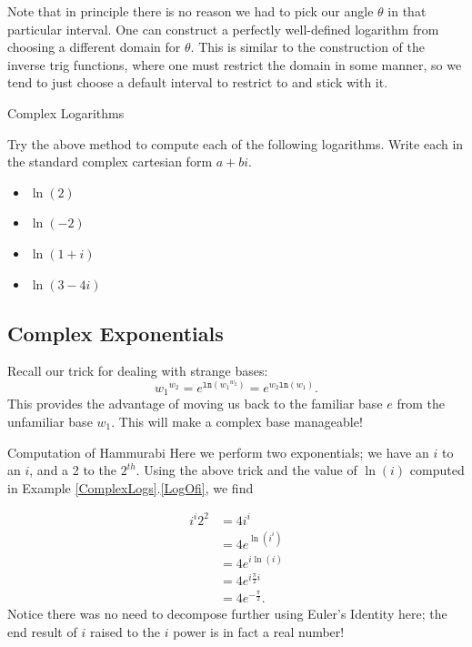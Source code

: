 Note that in principle there is no reason we had to pick our angle $\theta$ in that particular interval.  One can construct a perfectly well-defined logarithm from choosing a different domain for $\theta$.  This is similar to the construction of the inverse trig functions, where one must restrict the domain in some manner, so we tend to just choose a default interval to restrict to and stick with it.

\begin{exercise}{Complex Logarithms \Coffeecup \Coffeecup}

Try the above method to compute each of the following logarithms.  Write each in the standard complex cartesian form $a+bi$.

\begin{itemize}
\item $\ln(2)$
\vspace{.5in}
\item $\ln(-2)$
\vspace{.5in}
\item $\ln(1+i)$
\vspace{.5in}
\item $\ln(3-4i)$
\vspace{.5in}
\end{itemize}
\end{exercise}

\subsection{Complex Exponentials}

Recall our trick for dealing with strange bases: $${w_1}^{w_2}=e^{\mathtt{ln}{\left( {w_1}^{w_2} \right) }}=e^{w_2\mathtt{ln}{\left( w_1 \right)}}.$$
This provides the advantage of moving us back to the familiar base $e$ from the unfamiliar base $w_1$.  This will make a complex  base manageable!

\begin{example}{Computation of Hammurabi}
Here we perform two exponentials; we have an $i$ to an $i$, and a 2 to the $2^{th}$.  Using the above trick and the value of $\ln(i)$ computed in Example \ref{ComplexLogs}.\ref{LogOfi}, we find

\begin{align*}
i^i2^2&=4i^i\\
&=4e^{\ln\left(i^i\right)}\\
&=4e^{i\ln\left(i\right)}\\
&=4e^{i\frac{\pi}{2}i}\\
&=4e^{-\frac{\pi}{2}}.
\end{align*}
Notice there was no need to decompose further using Euler's Identity here; the end result of $i$ raised to the $i$ power is in fact a real number!
\end{example}

